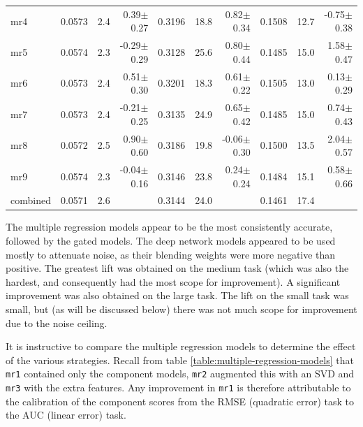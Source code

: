\documentclass{article}
\begin{document}
\begin{table}[t]
\begin{center}
\begin{small}
\begin{sc}
\begin{tabular}{l|rr r|rr r|rr r}
mr4        & 0.0573 &   2.4 &  0.39$\pm$0.27& 0.3196 &  18.8 &  0.82$\pm$0.34& 0.1508 &  12.7 & -0.75$\pm$0.38 \\ 
mr5        & 0.0574 &   2.3 & -0.29$\pm$0.29& 0.3128 &  25.6 &  0.80$\pm$0.44& 0.1485 &  15.0 &  1.58$\pm$0.47 \\ 
mr6        & 0.0573 &   2.4 &  0.51$\pm$0.30& 0.3201 &  18.3 &  0.61$\pm$0.22& 0.1505 &  13.0 &  0.13$\pm$0.29 \\ 
mr7        & 0.0573 &   2.4 & -0.21$\pm$0.25& 0.3135 &  24.9 &  0.65$\pm$0.42& 0.1485 &  15.0 &  0.74$\pm$0.43 \\ 
mr8        & 0.0572 &   2.5 &  0.90$\pm$0.60& 0.3186 &  19.8 & -0.06$\pm$0.30& 0.1500 &  13.5 &  2.04$\pm$0.57 \\ 
mr9        & 0.0574 &   2.3 & -0.04$\pm$0.16& 0.3146 &  23.8 &  0.24$\pm$0.24& 0.1484 &  15.1 &  0.58$\pm$0.66 \\ 
\abovespace\belowspace
combined   & 0.0571 &   2.6 &  & 0.3144 &  24.0 &  & 0.1461 &  17.4 &   \\ 
\hline
\end{tabular}
\end{sc}
\end{small}
\end{center}
\vskip -0.1in
\end{table}

The multiple regression models appear to be the most consistently accurate, followed by the gated models.  The deep network models appeared to be used mostly to attenuate noise, as their blending weights were more negative than positive.  The greatest lift was obtained on the medium task (which was also the hardest, and consequently had the most scope for improvement).  A significant improvement was also obtained on the large task.  The lift on the small task was small, but (as will be discussed below) there was not much scope for improvement due to the noise ceiling.

It is instructive to compare the multiple regression models to determine the effect of the various strategies.  Recall from table \ref{table:multiple-regression-models} that \texttt{mr1} contained only the component models, \texttt{mr2} augmented this with an SVD and \texttt{mr3} with the extra features.  Any improvement in \texttt{mr1} is therefore attributable to the calibration of the component scores from the RMSE (quadratic error) task to the AUC (linear error) task.
\end{document}

